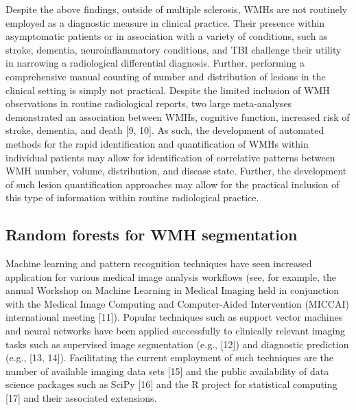 \documentclass[11pt,]{article}
\begin{document}
Despite the above findings, outside of multiple sclerosis, WMHs are not
routinely employed as a diagnostic measure in clinical practice. Their
presence within asymptomatic patients or in association with a variety
of conditions, such as stroke, dementia, neuroinflammatory conditions,
and TBI challenge their utility in narrowing a radiological differential
diagnosis. Further, performing a comprehensive manual counting of number
and distribution of lesions in the clinical setting is simply not
practical. Despite the limited inclusion of WMH observations in routine
radiological reports, two large meta-analyses demonstrated an
association between WMHs, cognitive function, increased risk of stroke,
dementia, and death {[}9, 10{]}. As such, the development of automated
methods for the rapid identification and quantification of WMHs within
individual patients may allow for identification of correlative patterns
between WMH number, volume, distribution, and disease state. Further,
the development of such lesion quantification approaches may allow for
the practical inclusion of this type of information within routine
radiological practice.

\subsection{Random forests for WMH
segmentation}\label{random-forests-for-wmh-segmentation}

Machine learning and pattern recognition techniques have seen increased
application for various medical image analysis workflows (see, for
example, the annual Workshop on Machine Learning in Medical Imaging held
in conjunction with the Medical Image Computing and Computer-Aided
Intervention (MICCAI) international meeting {[}11{]}). Popular
techniques such as support vector machines and neural networks have been
applied successfully to clinically relevant imaging tasks such as
supervised image segmentation (e.g., {[}12{]}) and diagnostic prediction
(e.g., {[}13, 14{]}). Facilitating the current employment of such
techniques are the number of available imaging data sets {[}15{]} and
the public availability of data science packages such as SciPy {[}16{]}
and the R project for statistical computing {[}17{]} and their
associated extensions.
\end{document}
